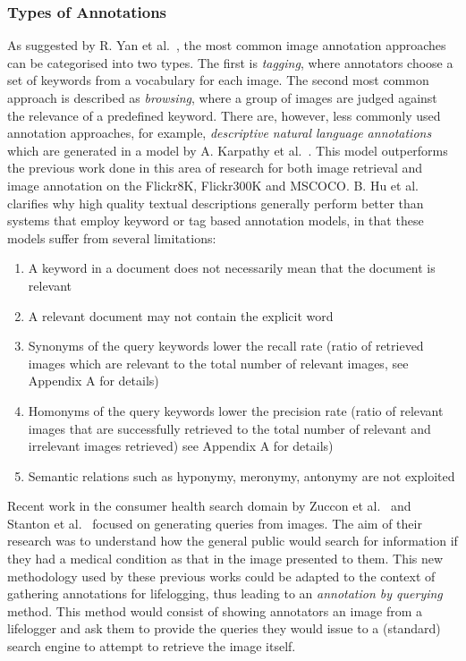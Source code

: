 \subsubsection{Types of Annotations}
As suggested by R. Yan et al.~\cite{yan2008learning}, the most common image annotation approaches can be categorised into two types. The first is \textit{tagging}, where annotators choose a set of keywords from a vocabulary for each image. The second most common approach is described as \textit{browsing}, where a group of images are judged against the relevance of a predefined keyword. There are, however, less commonly used annotation approaches, for example, \textit{descriptive natural language annotations} which are generated in a model by A. Karpathy et al.~\cite{karpathy2015deep}. This model outperforms the previous work done in this area of research for both image retrieval and image annotation on the Flickr8K, Flickr300K and MSCOCO. B. Hu et al.~\cite{hu2003ontology} clarifies why high quality textual descriptions generally perform better than systems that employ keyword or tag based annotation models, in that these models suffer from several limitations:
\begin{enumerate}
    \item A keyword in a document does not necessarily mean that the document is relevant
    \item A relevant document may not contain the explicit word
    \item Synonyms of the query keywords lower the recall rate (ratio of retrieved images which are relevant to the total number of relevant images, see Appendix A for details)
    \item Homonyms of the query keywords lower the precision rate  (ratio of relevant images that are successfully retrieved to the total number of relevant and irrelevant images retrieved) see Appendix A for details)
    \item Semantic relations such as hyponymy, meronymy, antonymy are not exploited
\end{enumerate}

Recent work in the consumer health search domain by Zuccon et al.~\cite{quteprints82599} and Stanton et al.~\cite{stanton2014circumlocution} focused on generating queries from images. The aim of their research was to understand how the general public would search for information if they had a medical condition as that in the image presented to them. This new methodology used by these previous works could be adapted to the context of gathering annotations for lifelogging, thus leading to an \textit{annotation by querying} method. This method would consist of showing annotators an image from a lifelogger and ask them to provide the queries they would issue to a (standard) search engine to attempt to retrieve the image itself.

